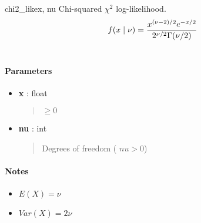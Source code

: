 \hypertarget{pymc.distributions.chi2_like}{}\begin{funcdesc}{chi2\_like}{x, nu}
Chi-squared $\chi^2$ log-likelihood.
\begin{gather}
\begin{split}f(x \mid \nu) = \frac{x^{(\nu-2)/2}e^{-x/2}}{2^{\nu/2}\Gamma(\nu/2)}\end{split}\notag\\\begin{split}\end{split}\notag
\end{gather}
\paragraph{Parameters}
\begin{itemize}
\item[] \textbf{x} : float
\begin{quote}

$\ge 0$
\end{quote}

\item[] \textbf{nu} : int
\begin{quote}

Degrees of freedom ( $nu > 0$)
\end{quote}
\end{itemize}
\paragraph{Notes}
\begin{itemize}
\item {} 
$E(X)=\nu$

\item {} 
$Var(X)=2\nu$

\end{itemize}
\end{funcdesc}

